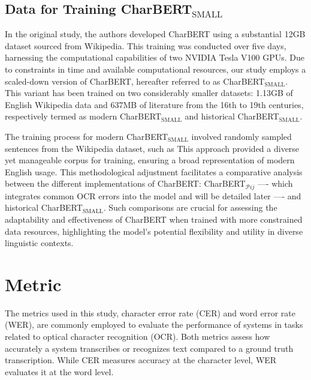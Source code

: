 \subsection{Data for Training CharBERT$_{\text{SMALL}}$}
\label{subsec:3_data_for_training_charbert}
In the original study, the authors developed CharBERT using a substantial 12GB dataset sourced from Wikipedia. This training was conducted over five days, harnessing the computational capabilities of two NVIDIA Tesla V100 GPUs. Due to constraints in time and available computational resources, our study employs a scaled-down version of CharBERT, hereafter referred to as CharBERT$_{\text{SMALL}}$. This variant has been trained on two considerably smaller datasets: 1.13GB of English Wikipedia data and 637MB of literature from the 16th to 19th centuries, respectively termed as modern CharBERT$_{\text{SMALL}}$ and historical CharBERT$_{\text{SMALL}}$.

The training process for modern CharBERT$_{\text{SMALL}}$ involved randomly sampled sentences from the Wikipedia dataset, such as  This approach provided a diverse yet manageable corpus for training, ensuring a broad representation of modern English usage. This methodological adjustment facilitates a comparative analysis between the different implementations of CharBERT: CharBERT$_{\mathcal{P}{ij}}$ —- which integrates common OCR errors into the model and will be detailed later —- and historical CharBERT$_{\text{SMALL}}$. Such comparisons are crucial for assessing the adaptability and effectiveness of CharBERT when trained with more constrained data resources, highlighting the model's potential flexibility and utility in diverse linguistic contexts.
\section{Metric}
\label{sec:5_metric}
The metrics used in this study, character error rate (CER) and word error rate (WER), are commonly employed to evaluate the performance of systems in tasks related to optical character recognition (OCR). Both metrics assess how accurately a system transcribes or recognizes text compared to a ground truth transcription. While CER measures accuracy at the character level, WER evaluates it at the word level.

